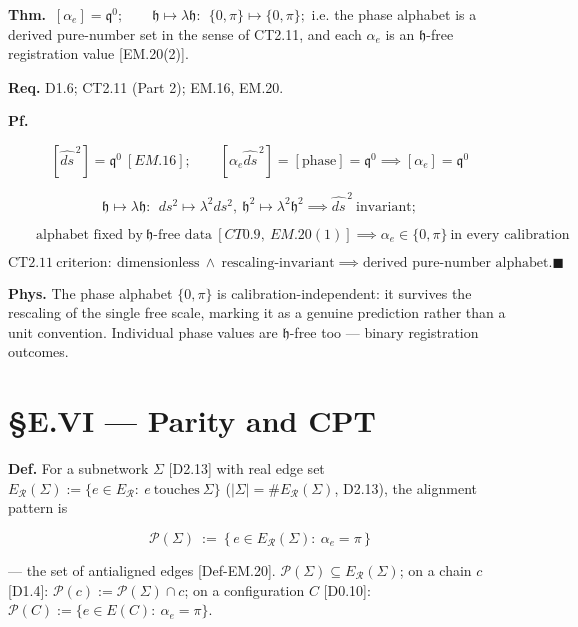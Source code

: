 \begin{theorem}\label{tag:EM-21}
\textbf{Thm.} $ \ [\alpha_e]=\mathfrak q^{0};\qquad \mathfrak h\mapsto\lambda\mathfrak h:\ \ \{0,\pi\}\mapsto\{0,\pi\};$ i.e. the phase alphabet is a derived pure-number set in the sense of CT2.11, and each $\alpha_e$ is an $\mathfrak h$-free registration value [EM.20(2)].

\textbf{Req.} D1.6; CT2.11 (Part 2); EM.16, EM.20.

\textbf{Pf.}

\[
[\widehat{ds}^{\,2}]=\mathfrak q^0\ [EM.16];\qquad[\alpha_e\widehat{ds}^{\,2}]=[\text{phase}]=\mathfrak q^0\implies[\alpha_e]=\mathfrak q^0
\]

\[
\mathfrak h\mapsto\lambda\mathfrak h:\ \ ds^2\mapsto\lambda^2ds^2,\ \mathfrak h^2\mapsto\lambda^2\mathfrak h^2\implies\widehat{ds}^{\,2}\ \text{invariant};
\]

\[
\qquad \text{alphabet fixed by}\ \mathfrak h\text{-free data}\ [CT0.9,\ EM.20(1)]\implies\alpha_e\in\{0,\pi\}\ \text{in every calibration}
\]

\[
\mathrm{CT2.11}\ \text{criterion}:\ \text{dimensionless}\ \wedge\ \text{rescaling-invariant}\implies\text{derived pure-number alphabet}. \blacksquare
\]

\textbf{Phys.} The phase alphabet $\{0,\pi\}$ is calibration-independent: it survives the rescaling of the single free scale, marking it as a genuine prediction rather than a unit convention. Individual phase values are $\mathfrak h$-free too — binary registration outcomes.

\end{theorem}

\section[§E.VI — Parity and CPT]{\texorpdfstring{§E.VI — Parity and CPT}{SE.VI - Parity and CPT}}

\begin{definition}\label{tag:Def-EM-21}
\textbf{Def.} For a subnetwork $\Sigma$ [D2.13] with real edge set $E_{\mathcal R}(\Sigma):=\{e\in E_{\mathcal R}:\ e\ \text{touches}\ \Sigma\}$ ($|\Sigma|=\#E_{\mathcal R}(\Sigma)$, D2.13), the alignment pattern is

\[
\mathcal P(\Sigma)\ :=\ \bigl\{\,e\in E_{\mathcal R}(\Sigma):\ \alpha_e=\pi\,\bigr\}
\]

— the set of antialigned edges [Def-EM.20]. $\mathcal P(\Sigma)\subseteq E_{\mathcal R}(\Sigma)$; on a chain $c$ [D1.4]: $\mathcal P(c):=\mathcal P(\Sigma)\cap c$; on a configuration $C$ [D0.10]: $\mathcal P(C):=\{e\in E(C):\ \alpha_e=\pi\}$.

\end{definition}

